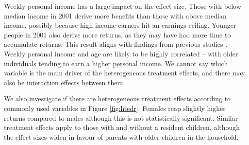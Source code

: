 \documentclass[12pt, a4paper]{article}
\begin{document}
Weekly personal income has a large impact on the effect size. Those with below median income in 2001 derive more benefits than those with above median income, possibly because high income earners hit an earnings ceiling. Younger people in 2001 also derive more returns, as they may have had more time to accumulate returns. This result aligns with findings from previous studies \citep{polidano2016,dorsett2016,perales2017}. Weekly personal income and age are likely to be highly correlated -- with older individuals tending to earn a higher personal income. We cannot say which variable is the main driver of the heterogeneous treatment effects, and there may also be interaction effects between them.

We also investigate if there are heterogeneous treatment effects according to commonly used variables in Figure \ref{fig:htedr}. Females reap slightly higher returns compared to males although this is not statistically significant. Similar treatment effects apply to those with and without a resident children, although the effect sizes widen in favour of parents with older children in the household. 
%
\
%
\end{document}
